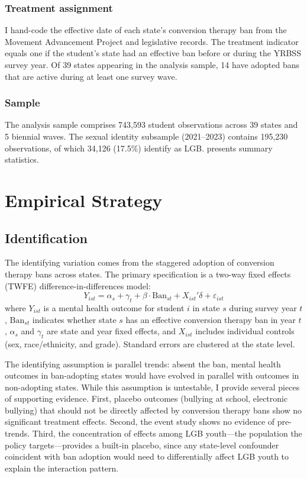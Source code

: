 \documentclass[12pt]{article}
\begin{document}
\subsubsection*{Treatment assignment} I hand-code the effective date of each state's conversion therapy ban from the Movement Advancement Project and legislative records. The treatment indicator equals one if the student's state had an effective ban before or during the YRBSS survey year. Of 39 states appearing in the analysis sample, 14 have adopted bans that are active during at least one survey wave.

\subsubsection*{Sample} The analysis sample comprises 743,593 student observations across 39 states and 5 biennial waves. The sexual identity subsample (2021--2023) contains 195,230 observations, of which 34,126 (17.5\%) identify as LGB.  presents summary statistics.



\section{Empirical Strategy}

\subsection{Identification}

The identifying variation comes from the staggered adoption of conversion therapy bans across states. The primary specification is a two-way fixed effects (TWFE) difference-in-differences model:
\begin{equation}
Y_{ist} = \alpha_s + \gamma_t + \beta \cdot \text{Ban}_{st} + X_{ist}'\delta + \varepsilon_{ist}
\label{eq:did}
\end{equation}
where $Y_{ist}$ is a mental health outcome for student $i$ in state $s$ during survey year $t$, $\text{Ban}_{st}$ indicates whether state $s$ has an effective conversion therapy ban in year $t$, $\alpha_s$ and $\gamma_t$ are state and year fixed effects, and $X_{ist}$ includes individual controls (sex, race/ethnicity, and grade). Standard errors are clustered at the state level.

The identifying assumption is parallel trends: absent the ban, mental health outcomes in ban-adopting states would have evolved in parallel with outcomes in non-adopting states. While this assumption is untestable, I provide several pieces of supporting evidence. First, placebo outcomes (bullying at school, electronic bullying) that should not be directly affected by conversion therapy bans show no significant treatment effects. Second, the event study shows no evidence of pre-trends. Third, the concentration of effects among LGB youth---the population the policy targets---provides a built-in placebo, since any state-level confounder coincident with ban adoption would need to differentially affect LGB youth to explain the interaction pattern.
\end{document}
